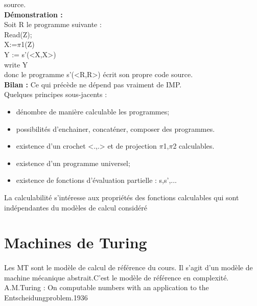 \documentclass{article}
\begin{document}
source.\\\textbf{Démonstration : }\\Soit R le programme suivante : \\Read(Z);\\X:=$\pi$1(Z)\\Y := s'(<X,X>)\\write Y\\donc le programme s'(<R,R>) écrit son propre code source.\\\textbf{Bilan : }Ce qui précède ne dépend pas vraiment de IMP.\\Quelques principes sous-jacents :\begin{itemize}
\item dénombre de manière calculable les programmes;
\item possibilités d'enchainer, concaténer, composer des programmes.
\item existence d'un crochet <.,.> et de projection $\pi$1,$\pi$2 calculables.
\item existence d'un programme universel;
\item existence de fonctions d'évaluation partielle : s,s',...
\end{itemize}
La calculabilité s'intéresse aux propriétés des fonctions calculables qui sont indépendantes du modèles de calcul considéré
\section{Machines de Turing} 
\paragraph{} Les MT sont le modèle de calcul de référence du cours. Il s'agit d'un modèle de machine mécanique abstrait.C'est le modèle de référence en complexité. A.M.Turing  : On computable numbers with an application to the Entscheidungproblem.1936
\end{document}
